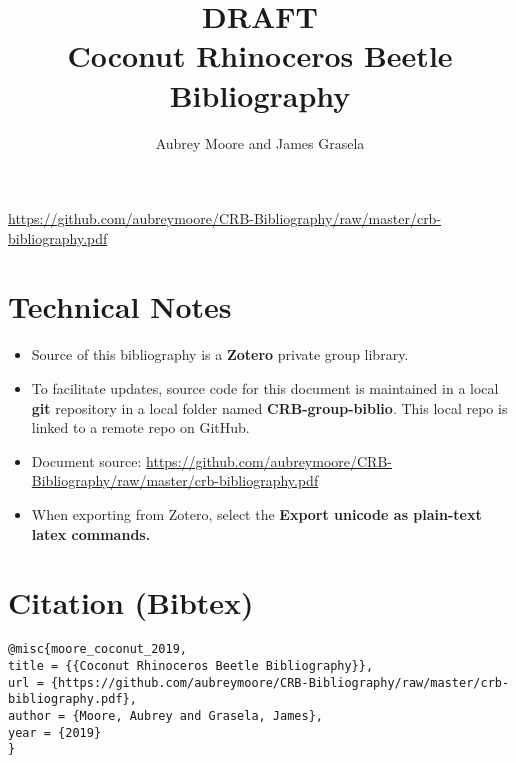 \documentclass[12pt,letterpaper,english]{scrartcl}
\title{DRAFT \\ Coconut Rhinoceros Beetle Bibliography}
\author{Aubrey Moore and James Grasela}
\begin{document}
\maketitle

\begin{center}
\small{\url{https://github.com/aubreymoore/CRB-Bibliography/raw/master/crb-bibliography.pdf}}
\end{center}

\printbibliography

\nocite{*}

\section*{Technical Notes}

\begin{itemize}
	\item Source of this bibliography is a \textbf{Zotero} private group library. 
	\item To facilitate updates, source code for this document is maintained in a local \textbf{git} repository in a local folder named \textbf{CRB-group-biblio}. This local repo is linked to a remote repo on GitHub. 
	\item Document source: \url{https://github.com/aubreymoore/CRB-Bibliography/raw/master/crb-bibliography.pdf}
	\item When exporting from Zotero, select the \textbf{Export unicode as plain-text latex commands.}
\end{itemize}

\section*{Citation (Bibtex)}

\begin{verbatim}
@misc{moore_coconut_2019,
title = {{Coconut Rhinoceros Beetle Bibliography}},
url = {https://github.com/aubreymoore/CRB-Bibliography/raw/master/crb-bibliography.pdf},
author = {Moore, Aubrey and Grasela, James},
year = {2019}
}
\end{verbatim}
\end{document}
